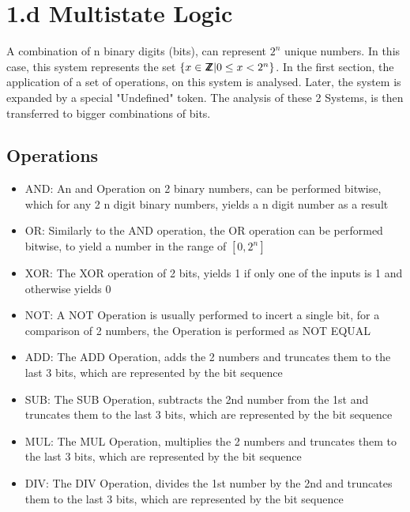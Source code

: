 \documentclass{aiaa-tc}
\newcommand*{\ZZ}{%
  \textsf{Z\kern-1ex Z}%
}
\begin{document}
\section{1.d Multistate Logic}
A combination of n binary digits (bits), can represent $2^n$ unique numbers. In this case, this system represents the set $ \{ x \in \ZZ | 0 \leq x < 2^n \} $.
In the first section, the application of a set of operations, on this system is analysed. Later, the system is expanded by a special "Undefined" token. The analysis of
these 2 Systems, is then transferred to bigger combinations of bits.

\subsection{Operations}
\begin{itemize}
    \item AND: An and Operation on 2 binary numbers, can be performed bitwise, which for any 2 n digit binary numbers, yields a n digit number as a result
    \item OR: Similarly to the AND operation, the OR operation can be performed bitwise, to yield a number in the range of $[0, 2^n]$
    \item XOR: The XOR operation of 2 bits, yields 1 if only one of the inputs is 1 and otherwise yields 0
    \item NOT: A NOT Operation is usually performed to incert a single bit, for a comparison of 2 numbers, the Operation is performed as NOT EQUAL
    \item ADD: The ADD Operation, adds the 2 numbers and truncates them to the last 3 bits, which are represented by the bit sequence
    \item SUB: The SUB Operation, subtracts the 2nd number from the 1st and truncates them to the last 3 bits, which are represented by the bit sequence
    \item MUL: The MUL Operation, multiplies the 2 numbers and truncates them to the last 3 bits, which are represented by the bit sequence
    \item DIV: The DIV Operation, divides the 1st number by the 2nd and truncates them to the last 3 bits, which are represented by the bit sequence
\end{itemize}
\end{document}
